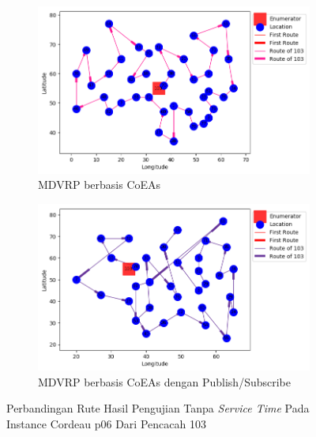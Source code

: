\begin{figure}[H]
	\centering
	\begin{subfigure}[t]{\textwidth}
		\centering
		\includegraphics[width=\textwidth]{Resources/Images/cordeau_p06/cordeau_p06_notw_103_coes}
		\caption{MDVRP berbasis CoEAs}
		\label{fig:cordeau_p06_notw_103_coes}
	\end{subfigure}
	\begin{subfigure}[t]{\textwidth}
		\centering
		\includegraphics[width=\textwidth]{Resources/Images/cordeau_p06/cordeau_p06_notw_103_pubsub_coes}
		\caption{MDVRP berbasis CoEAs dengan Publish/Subscribe}
		\label{fig:cordeau_p06_notw_103_pubsub_coes}
	\end{subfigure}
	\caption{Perbandingan Rute Hasil Pengujian Tanpa \textit{Service Time} Pada Instance Cordeau p06 Dari Pencacah 103}
	\label{fig:cordeau_p06_notw_103}
\end{figure}



